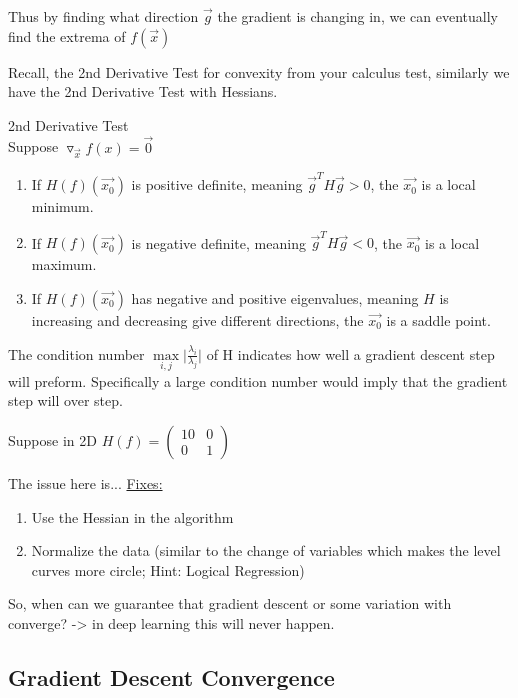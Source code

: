 Thus by finding what direction $\vec{g}$ the gradient is changing in, we can eventually find the extrema of $f(\vec{x})$

Recall, the 2nd Derivative Test for convexity from your calculus test, similarly we have the 2nd Derivative Test with Hessians.
\begin{theorem}
2nd Derivative Test\\
Suppose $\triangledown_{\vec{x}} f(x)=\vec{0}$\\
\begin{enumerate}
    \item If $H(f)(\vec{x_0})$ is positive definite, meaning $\vec{g}^TH\vec{g}>0$, the $\vec{x_0}$ is a local minimum.
    \item If $H(f)(\vec{x_0})$ is negative definite, meaning $\vec{g}^TH\vec{g}<0$, the $\vec{x_0}$ is a local maximum.
    \item If $H(f)(\vec{x_0})$ has negative and positive eigenvalues, meaning $H$ is increasing and decreasing give different directions, the $\vec{x_0}$ is a saddle point.
\end{enumerate}
\end{theorem}
\begin{remark}
The condition number $\max\limits_{i,j} \lvert\frac{\lambda_i}{\lambda_j} \rvert$
of H indicates how well a gradient descent step will preform. Specifically a large condition number would imply that the gradient step will over step. 
\end{remark} 

\begin{example}
Suppose in 2D $H(f)=
\begin{pmatrix} 
10 & 0\\
0 & 1
\end{pmatrix}
$
\end{example}
The issue here is...
\underline{Fixes:}
\begin{enumerate}
    \item Use the Hessian in the algorithm
    \item Normalize the data (similar to the change of variables which makes the level curves more circle; Hint: Logical Regression)
\end{enumerate}
So, when can we guarantee that gradient descent or some variation with converge? -> in deep learning this will never happen.


\subsection{Gradient Descent Convergence}
\label{GD-convergence}

